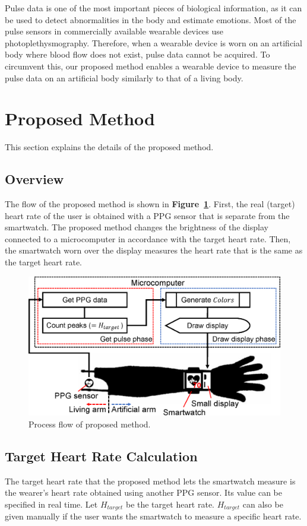 \documentclass[sigconf]{acmart}
\newcommand\figref[1]{\textbf{Figure~\ref{fig:#1}}}
\begin{document}
Pulse data is one of the most important pieces of biological information, as it can be used to detect abnormalities in the body and estimate emotions. Most of the pulse sensors in commercially available wearable devices use photoplethysmography. Therefore, when a wearable device is worn on an artificial body where blood flow does not exist, pulse data cannot be acquired. To circumvent this, our proposed method enables a wearable device to measure the pulse data on an artificial body similarly to that of a living body.



\section{Proposed Method}
\label{sec:method}
This section explains the details of the proposed method.

\subsection{Overview}
\label{subsec:overview}
The flow of the proposed method is shown in \figref{method}. First, the real (target) heart rate of the user is obtained with a PPG sensor that is separate from the smartwatch. The proposed method changes the brightness of the display connected to a microcomputer in accordance with the target heart rate. Then, the smartwatch worn over the display measures the heart rate that is the same as the target heart rate.

\begin{figure}[!t]
  \centering
  \includegraphics[width=0.75\linewidth]{figures/method.eps}
  \caption{Process flow of proposed method.}
  \label{fig:method}
\end{figure}


\subsection{Target Heart Rate Calculation}
The target heart rate that the proposed method lets the smartwatch measure is the wearer's heart rate obtained using another PPG sensor. Its value can be specified in real time. Let $H_{target}$ be the target heart rate. $H_{target}$ can also be given manually if the user wants the smartwatch to measure a specific heart rate.
\end{document}
